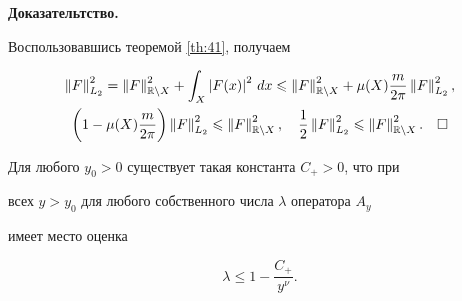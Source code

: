 {\bf Доказательтство.}


Воспользовавшись теоремой \ref{th:41}, получаем


\begin{gather*}


\norm{F}_{\Ltwo}^{2}=


\norm{F}_{\Bbb R\setminus X}^{2}+\int_{X}\abs{F(x)}^{2}\,dx\leqslant


\norm{F}_{\Bbb R\setminus X}^{2}+\mu(X)\frac{m}{2\pi}\norm{F}_{\Ltwo}^{2},\\


%


\bigg(1-\mu(X)\frac{m}{2\pi} \bigg)\norm{F}_{\Ltwo}^{2}\leqslant


\norm{F}_{\Bbb R\setminus X}^{2},\quad


\frac{1}{2}\norm{F}_{\Ltwo}^{2}\leqslant \norm{F}_{\Bbb R\setminus X}^{2}.	


\quad\square


\end{gather*}








\begin{lems} \label{le:41}


Для любого $y_{0}>0$ существует такая константа $C_{+}>0$, что при 


всех $y>y_{0}$ для любого собственного числа $\lambda$ оператора $A_{y}$ 


имеет место оценка


$$


\lambda\leqslant 1-\dfrac{C_{+}}{y^{\nu}}.


$$


\end{lems}








